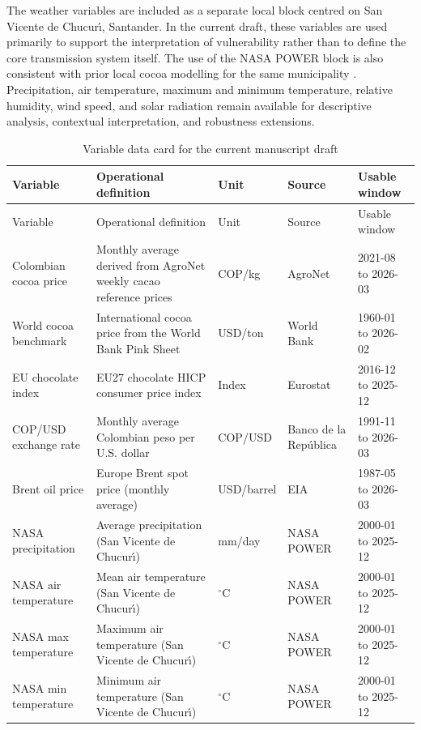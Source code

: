 \documentclass[11pt]{article}
\begin{document}
The weather variables are included as a separate local block centred on San Vicente de Chucur\'{\i}, Santander. In the current draft, these variables are used primarily to support the interpretation of vulnerability rather than to define the core transmission system itself. The use of the NASA POWER block is also consistent with prior local cocoa modelling for the same municipality \citep{talero_sarmiento_etal_2025}. Precipitation, air temperature, maximum and minimum temperature, relative humidity, wind speed, and solar radiation remain available for descriptive analysis, contextual interpretation, and robustness extensions.
\begingroup
\scriptsize
\setlength{\LTleft}{0pt}
\setlength{\LTright}{0pt}
\begin{longtable}{@{}p{2.6cm}p{3.6cm}p{1.4cm}p{2.2cm}p{2.8cm}@{}}
\caption{Variable data card for the current manuscript draft}
\label{tab:data_card}\\
\toprule
Variable & Operational definition & Unit & Source & Usable window \\
\midrule
\endfirsthead
\toprule
Variable & Operational definition & Unit & Source & Usable window \\
\midrule
\endhead
Colombian cocoa price & Monthly average derived from AgroNet weekly cacao reference prices & COP/kg & AgroNet & 2021-08 to 2026-03 \\
World cocoa benchmark & International cocoa price from the World Bank Pink Sheet & USD/ton & World Bank & 1960-01 to 2026-02 \\
EU chocolate index & EU27 chocolate HICP consumer price index & Index & Eurostat & 2016-12 to 2025-12 \\
COP/USD exchange rate & Monthly average Colombian peso per U.S. dollar & COP/USD & Banco de la Rep\'ublica & 1991-11 to 2026-03 \\
Brent oil price & Europe Brent spot price (monthly average) & USD/barrel & EIA & 1987-05 to 2026-03 \\
NASA precipitation & Average precipitation (San Vicente de Chucur\'{\i}) & mm/day & NASA POWER & 2000-01 to 2025-12 \\
NASA air temperature & Mean air temperature (San Vicente de Chucur\'{\i}) & $^\circ$C & NASA POWER & 2000-01 to 2025-12 \\
NASA max temperature & Maximum air temperature (San Vicente de Chucur\'{\i}) & $^\circ$C & NASA POWER & 2000-01 to 2025-12 \\
NASA min temperature & Minimum air temperature (San Vicente de Chucur\'{\i}) & $^\circ$C & NASA POWER & 2000-01 to 2025-12 \\

\end{longtable}
\end{document}
